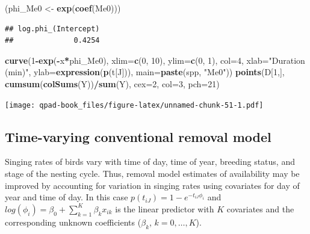 \documentclass[12pt,]{book}
\newenvironment{Shaded}{\begin{snugshade}}{\end{snugshade}}
\newcommand{\DataTypeTok}[1]{\textcolor[rgb]{0.13,0.29,0.53}{#1}}
\newcommand{\DecValTok}[1]{\textcolor[rgb]{0.00,0.00,0.81}{#1}}
\newcommand{\KeywordTok}[1]{\textcolor[rgb]{0.13,0.29,0.53}{\textbf{#1}}}
\newcommand{\NormalTok}[1]{#1}
\newcommand{\OperatorTok}[1]{\textcolor[rgb]{0.81,0.36,0.00}{\textbf{#1}}}
\newcommand{\StringTok}[1]{\textcolor[rgb]{0.31,0.60,0.02}{#1}}
\begin{document}
\begin{Shaded}
\begin{Highlighting}[]
\NormalTok{(phi_Me0 <-}\StringTok{ }\KeywordTok{exp}\NormalTok{(}\KeywordTok{coef}\NormalTok{(Me0)))}
\end{Highlighting}
\end{Shaded}

\begin{verbatim}
## log.phi_(Intercept) 
##              0.4254
\end{verbatim}

\begin{Shaded}
\begin{Highlighting}[]
\KeywordTok{curve}\NormalTok{(}\DecValTok{1}\OperatorTok{-}\KeywordTok{exp}\NormalTok{(}\OperatorTok{-}\NormalTok{x}\OperatorTok{*}\NormalTok{phi_Me0), }\DataTypeTok{xlim=}\KeywordTok{c}\NormalTok{(}\DecValTok{0}\NormalTok{, }\DecValTok{10}\NormalTok{), }\DataTypeTok{ylim=}\KeywordTok{c}\NormalTok{(}\DecValTok{0}\NormalTok{, }\DecValTok{1}\NormalTok{), }\DataTypeTok{col=}\DecValTok{4}\NormalTok{,}
  \DataTypeTok{xlab=}\StringTok{"Duration (min)"}\NormalTok{, }\DataTypeTok{ylab=}\KeywordTok{expression}\NormalTok{(}\KeywordTok{p}\NormalTok{(t[J])), }
  \DataTypeTok{main=}\KeywordTok{paste}\NormalTok{(spp, }\StringTok{"Me0"}\NormalTok{))}
\KeywordTok{points}\NormalTok{(D[}\DecValTok{1}\NormalTok{,], }\KeywordTok{cumsum}\NormalTok{(}\KeywordTok{colSums}\NormalTok{(Y))}\OperatorTok{/}\KeywordTok{sum}\NormalTok{(Y), }\DataTypeTok{cex=}\DecValTok{2}\NormalTok{, }\DataTypeTok{col=}\DecValTok{3}\NormalTok{, }\DataTypeTok{pch=}\DecValTok{21}\NormalTok{)}
\end{Highlighting}
\end{Shaded}

\texttt{[image: qpad-book\_files/figure-latex/unnamed-chunk-51-1.pdf]}

\hypertarget{time-varying-conventional-removal-model}{%
\subsection{Time-varying conventional removal model}\label{time-varying-conventional-removal-model}}

Singing rates of birds vary with time of day, time of year, breeding status, and stage of the nesting cycle.
Thus, removal model estimates of availability may be improved by accounting for variation in singing rates
using covariates for day of year and time of day.
In this case \(p(t_{iJ}) = 1 - e^{-t_{iJ} \phi_{i}}\) and \(log(\phi_{i}) = \beta_{0} + \sum^{K}_{k=1} \beta_{k} x_{ik}\) is the linear predictor with \(K\) covariates and the corresponding unknown coefficients (\(\beta_{k}\), \(k = 0,\ldots, K\)).
\end{document}
